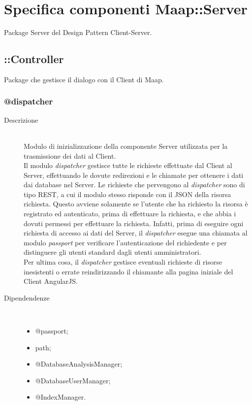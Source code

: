\section{Specifica componenti Maap::Server}

Package Server del Design Pattern Client-Server. 

\subsection{::Controller}
Package che gestisce il dialogo con il Client di Maap. 
\subsubsection{@dispatcher}

\begin{description}
 \item[Descrizione] \hfill \\
Modulo di inizializzazione della componente Server utilizzata per la trasmissione dei dati al Client. \\
Il modulo \textit{dispatcher} gestisce tutte le richieste effettuate dal Client al Server, effettuando le dovute redirezioni e le chiamate per ottenere i dati dai database nel Server. Le richieste che pervengono al 
\textit{dispatcher} sono di tipo REST, a cui il modulo stesso risponde con il JSON della risorsa richiesta. 
Questo avviene solamente se l'utente che ha richiesto la risorsa è registrato ed autenticato, prima di 
effettuare la richiesta, e che abbia i dovuti permessi per effettuare la richiesta. Infatti, prima di eseguire ogni richiesta di accesso ai dati del Server, il \textit{dispatcher} esegue una chiamata al modulo \textit{passport} per verificare l'autenticazione del richiedente e per distinguere gli utenti standard dagli utenti amministratori. \\
Per ultima cosa, il \textit{dispatcher} gestisce eventuali richieste di risorse inesistenti o errate reindirizzando il chiamante alla pagina iniziale del Client AngularJS.
 \item[Dipendendenze] \hfill \\
 \begin{itemize}
 \item @passport;
 \item path;
 \item @DatabaseAnalysisManager;
 \item @DatabaseUserManager;
 \item @IndexManager.
 \end{itemize}
 

\end{description}
